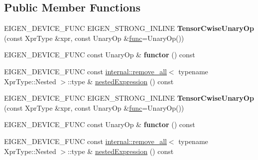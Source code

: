 \subsection*{Public Member Functions}
\begin{DoxyCompactItemize}
\item 
\mbox{\label{class_eigen_1_1_tensor_cwise_unary_op_a9c18f146f1bc3820525cb9befba64b6d}} 
E\+I\+G\+E\+N\+\_\+\+D\+E\+V\+I\+C\+E\+\_\+\+F\+U\+NC E\+I\+G\+E\+N\+\_\+\+S\+T\+R\+O\+N\+G\+\_\+\+I\+N\+L\+I\+NE {\bfseries Tensor\+Cwise\+Unary\+Op} (const Xpr\+Type \&xpr, const Unary\+Op \&\hyperlink{structfunc}{func}=Unary\+Op())
\item 
\mbox{\label{class_eigen_1_1_tensor_cwise_unary_op_a985c0b5fedf2adc79d69e7bd7f58c04f}} 
E\+I\+G\+E\+N\+\_\+\+D\+E\+V\+I\+C\+E\+\_\+\+F\+U\+NC const Unary\+Op \& {\bfseries functor} () const
\item 
E\+I\+G\+E\+N\+\_\+\+D\+E\+V\+I\+C\+E\+\_\+\+F\+U\+NC const \hyperlink{struct_eigen_1_1internal_1_1remove__all}{internal\+::remove\+\_\+all}$<$ typename Xpr\+Type\+::\+Nested $>$\+::type \& \hyperlink{class_eigen_1_1_tensor_cwise_unary_op_af3a260b2117072817e641d72038cce51}{nested\+Expression} () const
\item 
\mbox{\label{class_eigen_1_1_tensor_cwise_unary_op_a9c18f146f1bc3820525cb9befba64b6d}} 
E\+I\+G\+E\+N\+\_\+\+D\+E\+V\+I\+C\+E\+\_\+\+F\+U\+NC E\+I\+G\+E\+N\+\_\+\+S\+T\+R\+O\+N\+G\+\_\+\+I\+N\+L\+I\+NE {\bfseries Tensor\+Cwise\+Unary\+Op} (const Xpr\+Type \&xpr, const Unary\+Op \&\hyperlink{structfunc}{func}=Unary\+Op())
\item 
\mbox{\label{class_eigen_1_1_tensor_cwise_unary_op_a985c0b5fedf2adc79d69e7bd7f58c04f}} 
E\+I\+G\+E\+N\+\_\+\+D\+E\+V\+I\+C\+E\+\_\+\+F\+U\+NC const Unary\+Op \& {\bfseries functor} () const
\item 
E\+I\+G\+E\+N\+\_\+\+D\+E\+V\+I\+C\+E\+\_\+\+F\+U\+NC const \hyperlink{struct_eigen_1_1internal_1_1remove__all}{internal\+::remove\+\_\+all}$<$ typename Xpr\+Type\+::\+Nested $>$\+::type \& \hyperlink{class_eigen_1_1_tensor_cwise_unary_op_af3a260b2117072817e641d72038cce51}{nested\+Expression} () const
\end{DoxyCompactItemize}

